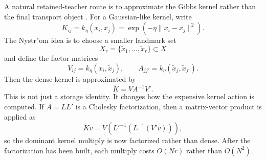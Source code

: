 A natural retained-teacher route is to approximate the Gibbs kernel rather than
the final transport object \citep{altschuler2019nystrom}.  For a Gaussian-like
kernel, write
\begin{equation}
\label{eq:bf-learned-ot-nystrom-gibbs}
  K_{ij}
  =
  k_\eta(x_i,x_j)
  =
  \exp(-\eta\|x_i-x_j\|^2).
\end{equation}
The Nystr"om idea is to choose a smaller landmark set
\begin{equation}
\label{eq:bf-learned-ot-nystrom-landmarks}
  X_r=\{\tilde x_1,\ldots,\tilde x_r\}\subset X
\end{equation}
and define the factor matrices
\begin{equation}
\label{eq:bf-learned-ot-nystrom-factors}
  V_{ij}=k_\eta(x_i,\tilde x_j),
  \qquad
  A_{jj'}=k_\eta(\tilde x_j,\tilde x_{j'}).
\end{equation}
Then the dense kernel is approximated by
\begin{equation}
\label{eq:bf-learned-ot-nystrom-kernel}
  \widetilde K = V A^{-1}V'.
\end{equation}
This is not just a storage identity.  It changes how the expensive kernel action is
computed.  If \(A=LL'\) is a Cholesky factorization, then a matrix-vector product
is applied as
\begin{equation}
\label{eq:bf-learned-ot-nystrom-matvec}
  \widetilde K v
  =
  V\left(L'^{-1}\left(L^{-1}(V'v)\right)\right),
\end{equation}
so the dominant kernel multiply is now factorized rather than dense.  After the
factorization has been built, each multiply costs \(O(Nr)\) rather than
\(O(N^2)\).

